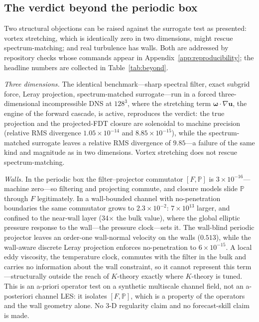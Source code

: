 \documentclass[aps,prfluids,preprint,superscriptaddress,nofootinbib]{revtex4-2}
\begin{document}
\subsection{The verdict beyond the periodic box}
\label{sec:beyond}

Two structural objections can be raised against the surrogate test as presented: vortex stretching, which is identically zero in two dimensions, might rescue spectrum-matching; and real turbulence has walls. Both are addressed by repository checks whose commands appear in Appendix~\ref{app:reproducibility}; the headline numbers are collected in Table~\ref{tab:beyond}.

\emph{Three dimensions.} The identical benchmark---sharp spectral filter, exact subgrid force, Leray projection, spectrum-matched surrogate---run in a forced three-dimensional incompressible DNS at $128^3$, where the stretching term $\boldsymbol{\omega}\cdot\nabla\mathbf{u}$, the engine of the forward cascade, is active, reproduces the verdict: the true projection and the projected-FDT closure are solenoidal to machine precision (relative RMS divergence $1.05\times10^{-14}$ and $8.85\times10^{-15}$), while the spectrum-matched surrogate leaves a relative RMS divergence of $9.85$---a failure of the same kind and magnitude as in two dimensions. Vortex stretching does not rescue spectrum-matching.

\emph{Walls.} In the periodic box the filter--projector commutator $[F,\mathbb{P}]$ is $3\times10^{-16}$---machine zero---so filtering and projecting commute, and closure models slide $\mathbb{P}$ through $F$ legitimately. In a wall-bounded channel with no-penetration boundaries the same commutator grows to $2.3\times10^{-2}$: $7\times10^{13}$ larger, and confined to the near-wall layer (34$\times$ the bulk value), where the global elliptic pressure response to the wall---the pressure clock---sets it. The wall-blind periodic projector leaves an order-one wall-normal velocity on the walls ($0.513$), while the wall-aware discrete Leray projection enforces no-penetration to $6\times10^{-15}$. A local eddy viscosity, the temperature clock, commutes with the filter in the bulk and carries no information about the wall constraint, so it cannot represent this term---structurally outside the reach of $K$-theory exactly where $K$-theory is tuned. This is an a-priori operator test on a synthetic multiscale channel field, not an a-posteriori channel LES: it isolates $[F,\mathbb{P}]$, which is a property of the operators and the wall geometry alone. No 3-D regularity claim and no forecast-skill claim is made.
\end{document}
